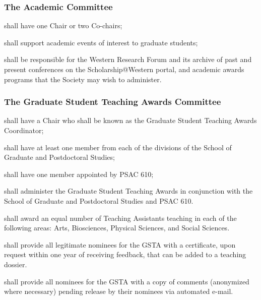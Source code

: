     
\subsubsection{The Academic Committee}

\begin{longenum}[ label*=\thesubsubsection.\arabic*., align=left]
	\item shall have one Chair or two Co-chairs;
    \item shall support academic events of interest to graduate students;
    \item shall be responsible for the Western Research Forum and its archive of past and present conferences on the Scholarship@Western portal, and academic awards programs that the Society may wish to administer.

\end{longenum}

\subsubsection{The Graduate Student Teaching Awards Committee}
\begin{longenum}[ label*=\thesubsubsection.\arabic*., align=left]
	\item shall have a Chair who shall be known as the Graduate Student Teaching Awards Coordinator;
    \item shall have at least one member from each of the divisions of the School of Graduate and Postdoctoral Studies;
    \item shall have one member appointed by PSAC 610;
    \item shall administer the Graduate Student Teaching Awards in conjunction with the School of Graduate and Postdoctoral Studies and PSAC 610.
    \item shall award an equal number of Teaching Assistants teaching in each of the following areas: Arts, Biosciences, Physical Sciences, and Social Sciences.
\item shall provide all legitimate nominees for the GSTA with a certificate, upon request within one year of receiving feedback, that can be added to a teaching
dossier.
\item shall provide all nominees for the GSTA with a copy of comments (anonymized where necessary) pending
release by their nominees via automated e-mail.

\end{longenum}

